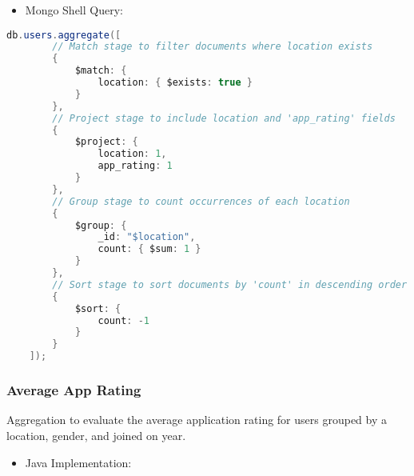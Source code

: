 \begin{itemize}
    \item Mongo Shell Query:
\end{itemize}
\begin{mdframed}[style=customstyle2]
\begin{lstlisting}[language=java, backgroundcolor=\color{white}]
    db.users.aggregate([
        // Match stage to filter documents where location exists
        {
            $match: {
                location: { $exists: true }
            }
        },
        // Project stage to include location and 'app_rating' fields
        {
            $project: {
                location: 1,
                app_rating: 1
            }
        },
        // Group stage to count occurrences of each location
        {
            $group: {
                _id: "$location",
                count: { $sum: 1 }
            }
        },
        // Sort stage to sort documents by 'count' in descending order
        {
            $sort: {
                count: -1
            }
        }
    ]);\end{lstlisting}
\end{mdframed} 

\subsubsection*{Average App Rating}

Aggregation to evaluate the average application rating for users grouped by a location,
gender, and joined on year.
\begin{itemize}
    \item Java Implementation:
\end{itemize}

